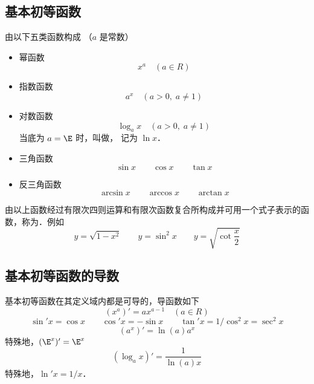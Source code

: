 

\subsection{基本初等函数}
由以下五类函数构成 （$a$ 是常数）

\begin{itemize}
\item 幂函数
\begin{equation}
x^a \quad(a \in R)
\end{equation}
\item 指数函数
\begin{equation}
a^x \quad(a > 0, \; a \ne 1)
\end{equation}
\item 对数函数
\begin{equation}
\log_a x \quad(a > 0, \; a \ne 1)
\end{equation}
当底为 $a = \E$ 时，叫做， 记为 $\ln x$．
\item 三角函数
\begin{equation}
\sin x \qquad  \cos x \qquad \tan x
\end{equation}
\item 反三角函数
\begin{equation}
\arcsin x  \qquad \arccos x  \qquad \arctan x
\end{equation}
\end{itemize}

由以上函数经过有限次四则运算和有限次函数复合所构成并可用一个式子表示的函数，称为．例如
\begin{equation}
y = \sqrt{1 - x^2}\qquad y = \sin ^2 x\qquad y = \sqrt{\cot \frac{x}{2}} 
\end{equation}



\subsection{基本初等函数的导数}

基本初等函数在其定义域内都是可导的，导函数如下\\
\begin{equation}
(x^a)' = a x^{a - 1}  \quad (a \in R)
\end{equation}
\begin{equation}
\sin' x = \cos x \qquad \cos' x =  - \sin x \qquad
\tan'x = 1/\cos ^2 x = \sec ^2 x
\end{equation}
\begin{equation}
(a^x)' = \ln(a) a^x
\end{equation}
特殊地，$(\E^x)' = \E^x$\\
\begin{equation}
(\log_a x)' = \frac{1}{\ln(a)x}
\end{equation}
特殊地，$\ln' x= 1/x$．

